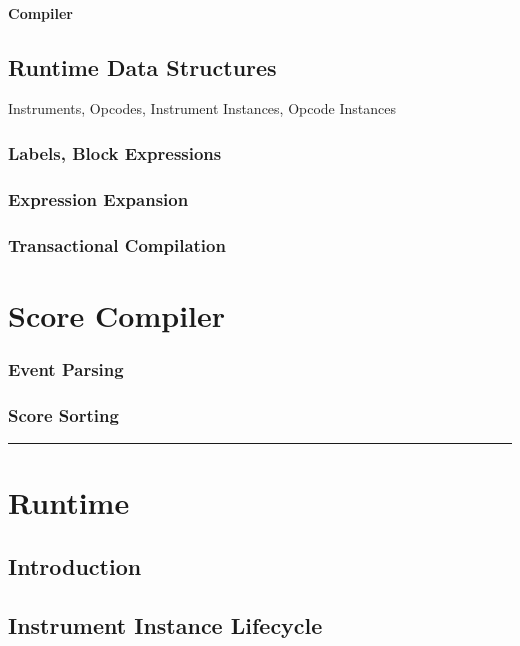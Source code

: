 \documentclass[]{book}
\begin{document}
\subsubsection{Compiler}

\section{Runtime Data Structures}

Instruments, Opcodes, Instrument Instances, Opcode Instances

\subsection{Labels, Block Expressions}

\subsection{Expression Expansion}

\subsection{Transactional Compilation}


\chapter{Score Compiler}

\subsection{Event Parsing}

\subsection{Score Sorting}

\begin{center}\rule{3in}{0.4pt}\end{center}

\chapter{Runtime}

\section{Introduction}

\section{Instrument Instance Lifecycle}
\end{document}
